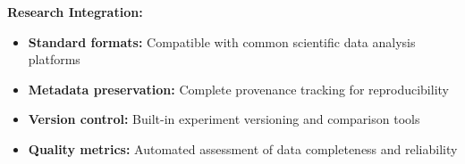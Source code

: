 \documentclass[11pt,a4paper]{article}
\begin{document}
\textbf{Research Integration:}
\begin{itemize}
\item \textbf{Standard formats:} Compatible with common scientific data analysis platforms
\item \textbf{Metadata preservation:} Complete provenance tracking for reproducibility
\item \textbf{Version control:} Built-in experiment versioning and comparison tools
\item \textbf{Quality metrics:} Automated assessment of data completeness and reliability
\end{itemize}
\end{document}
